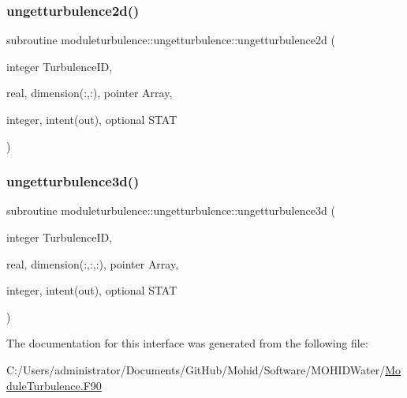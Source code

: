 \subsubsection{\texorpdfstring{ungetturbulence2d()}{ungetturbulence2d()}}
{\footnotesize\ttfamily subroutine moduleturbulence\+::ungetturbulence\+::ungetturbulence2d (\begin{DoxyParamCaption}\item[{integer}]{Turbulence\+ID,  }\item[{real, dimension(\+:,\+:), pointer}]{Array,  }\item[{integer, intent(out), optional}]{S\+T\+AT }\end{DoxyParamCaption})\hspace{0.3cm}{\ttfamily [private]}}

\mbox{\label{interfacemoduleturbulence_1_1ungetturbulence_a1ba4ee00dfb24289f993639fa39aa733}} 
\subsubsection{\texorpdfstring{ungetturbulence3d()}{ungetturbulence3d()}}
{\footnotesize\ttfamily subroutine moduleturbulence\+::ungetturbulence\+::ungetturbulence3d (\begin{DoxyParamCaption}\item[{integer}]{Turbulence\+ID,  }\item[{real, dimension(\+:,\+:,\+:), pointer}]{Array,  }\item[{integer, intent(out), optional}]{S\+T\+AT }\end{DoxyParamCaption})\hspace{0.3cm}{\ttfamily [private]}}



The documentation for this interface was generated from the following file\+:\begin{DoxyCompactItemize}
\item 
C\+:/\+Users/administrator/\+Documents/\+Git\+Hub/\+Mohid/\+Software/\+M\+O\+H\+I\+D\+Water/\mbox{\hyperlink{_module_turbulence_8_f90}{Module\+Turbulence.\+F90}}\end{DoxyCompactItemize}
